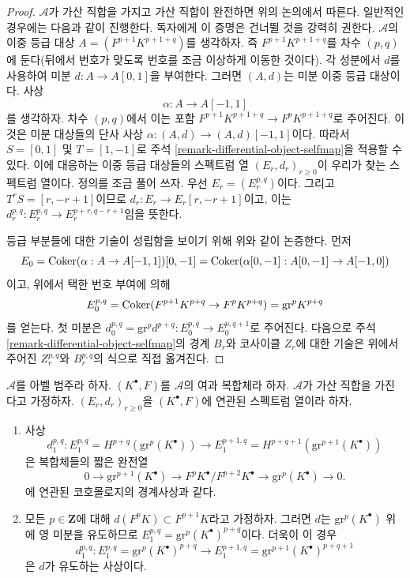 \begin{proof}
$\mathcal{A}$가 가산 직합을 가지고 가산 직합이 완전하면 위의 논의에서
따른다. 일반적인 경우에는 다음과 같이 진행한다. 독자에게 이 증명은
건너뛸 것을 강력히 권한다. $\mathcal{A}$의 이중 등급 대상
$A = (F^{p + 1}K^{p + 1 + q})$를 생각하자. 즉
$F^{p + 1}K^{p + 1 + q}$를 차수 $(p, q)$에 둔다(뒤에서 번호가 맞도록
번호를 조금 이상하게 이동한 것이다). 각 성분에서 $d$를 사용하여
미분 $d : A \to A[0, 1]$을 부여한다. 그러면 $(A, d)$는 미분 이중
등급 대상이다. 사상
$$
\alpha : A \to A[-1, 1]
$$
를 생각하자. 차수 $(p, q)$에서 이는 포함
$F^{p + 1}K^{p + 1 + q} \to F^pK^{p + 1 + q}$로 주어진다. 이것은 미분
대상들의 단사 사상 $\alpha : (A, d) \to (A, d)[-1, 1]$이다. 따라서
$S = [0, 1]$ 및 $T = [1, -1]$로 주석
\ref{remark-differential-object-selfmap}을 적용할 수 있다. 이에 대응하는
이중 등급 대상들의 스펙트럼 열 $(E_r, d_r)_{r \geq 0}$이 우리가 찾는
스펙트럼 열이다. 정의를 조금 풀어 쓰자. 우선
$E_r = (E_r^{p, q})$이다. 그리고 $T^rS = [r, -r + 1]$이므로
$d_r : E_r \to E_r[r, -r + 1]$이고, 이는
$d_r^{p, q} : E_r^{p, q} \to E_r^{p + r, q - r + 1}$임을 뜻한다.

\medskip\noindent
등급 부분들에 대한 기술이 성립함을 보이기 위해 위와 같이 논증한다.
먼저
$$
E_0 = \mathop{\mathrm{Coker}}(\alpha : A \to A[-1, 1])[0, -1] =
\mathop{\mathrm{Coker}}(\alpha[0, -1] : A[0, -1] \to A[-1, 0])
$$
이고, 위에서 택한 번호 부여에 의해
$$
E_0^{p, q} = \mathop{\mathrm{Coker}}(F^{p + 1}K^{p + q} \to F^pK^{p + q}) = \text{gr}^pK^{p + q}
$$
를 얻는다. 첫 미분은
$d_0^{p, q} = \text{gr}^pd^{p + q} : E_0^{p, q} \to E_0^{p, q + 1}$로
주어진다. 다음으로 주석 \ref{remark-differential-object-selfmap}의
경계 $B_r$와 코사이클 $Z_r$에 대한 기술은 위에서 주어진
$Z_r^{p, q}$와 $B_r^{p, q}$의 식으로 직접 옮겨진다.
\end{proof}

\begin{lemma}
\label{lemma-spectral-sequence-filtered-complex-d1}
$\mathcal{A}$를 아벨 범주라 하자. $(K^\bullet, F)$를 $\mathcal{A}$의
여과 복합체라 하자. $\mathcal{A}$가 가산 직합을 가진다고 가정하자.
$(E_r, d_r)_{r \geq 0}$을 $(K^\bullet, F)$에 연관된 스펙트럼 열이라 하자.
\begin{enumerate}
\item 사상
$$
d_1^{p, q} :
E_1^{p, q} = H^{p + q}(\text{gr}^p(K^\bullet))
\longrightarrow
E_1^{p + 1, q} = H^{p + q + 1}(\text{gr}^{p + 1}(K^\bullet))
$$
은 복합체들의 짧은 완전열
$$
0 \to \text{gr}^{p + 1}(K^\bullet) \to
F^pK^\bullet/F^{p + 2}K^\bullet \to \text{gr}^p(K^\bullet) \to 0.
$$
에 연관된 코호몰로지의 경계사상과 같다.
\item 모든 $p \in \mathbf{Z}$에 대해
$d(F^pK) \subset F^{p + 1}K$라고 가정하자. 그러면 $d$는
$\text{gr}^p(K^\bullet)$ 위에 영 미분을 유도하므로
$E_1^{p, q} = \text{gr}^p(K^\bullet)^{p + q}$이다. 더욱이 이 경우
$$
d_1^{p, q} :
E_1^{p, q} = \text{gr}^p(K^\bullet)^{p + q}
\longrightarrow
E_1^{p + 1, q} = \text{gr}^{p + 1}(K^\bullet)^{p + q + 1}
$$
은 $d$가 유도하는 사상이다.
\end{enumerate}
\end{lemma}


